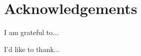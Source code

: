 \thispagestyle{empty}


\section*{\centering Acknowledgements}


I am grateful to...

I'd like to thank...

